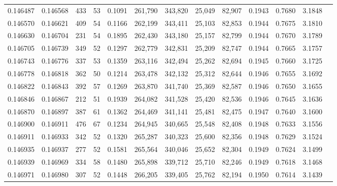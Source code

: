 \begin{tabular}{rrrrrrrrrrrrr}
0.146487 & 0.146568 &   433 &  53 &                                     0.1091 & 261,790 & 343,820 &  25,049 &  82,907 & 0.1943 & 0.7680 & 3.1848 \\
0.146570 & 0.146621 &   409 &  54 &                                     0.1166 & 262,199 & 343,411 &  25,103 &  82,853 & 0.1944 & 0.7675 & 3.1810 \\
0.146630 & 0.146704 &   231 &  54 &                                     0.1895 & 262,430 & 343,180 &  25,157 &  82,799 & 0.1944 & 0.7670 & 3.1789 \\
0.146705 & 0.146739 &   349 &  52 &                                     0.1297 & 262,779 & 342,831 &  25,209 &  82,747 & 0.1944 & 0.7665 & 3.1757 \\
0.146743 & 0.146776 &   337 &  53 &                                     0.1359 & 263,116 & 342,494 &  25,262 &  82,694 & 0.1945 & 0.7660 & 3.1725 \\
0.146778 & 0.146818 &   362 &  50 &                                     0.1214 & 263,478 & 342,132 &  25,312 &  82,644 & 0.1946 & 0.7655 & 3.1692 \\
0.146822 & 0.146843 &   392 &  57 &                                     0.1269 & 263,870 & 341,740 &  25,369 &  82,587 & 0.1946 & 0.7650 & 3.1655 \\
0.146846 & 0.146867 &   212 &  51 &                                     0.1939 & 264,082 & 341,528 &  25,420 &  82,536 & 0.1946 & 0.7645 & 3.1636 \\
0.146870 & 0.146897 &   387 &  61 &                                     0.1362 & 264,469 & 341,141 &  25,481 &  82,475 & 0.1947 & 0.7640 & 3.1600 \\
0.146900 & 0.146911 &   476 &  67 &                                     0.1234 & 264,945 & 340,665 &  25,548 &  82,408 & 0.1948 & 0.7633 & 3.1556 \\
0.146911 & 0.146933 &   342 &  52 &                                     0.1320 & 265,287 & 340,323 &  25,600 &  82,356 & 0.1948 & 0.7629 & 3.1524 \\
0.146935 & 0.146937 &   277 &  52 &                                     0.1581 & 265,564 & 340,046 &  25,652 &  82,304 & 0.1949 & 0.7624 & 3.1499 \\
0.146939 & 0.146969 &   334 &  58 &                                     0.1480 & 265,898 & 339,712 &  25,710 &  82,246 & 0.1949 & 0.7618 & 3.1468 \\
0.146971 & 0.146980 &   307 &  52 &                                     0.1448 & 266,205 & 339,405 &  25,762 &  82,194 & 0.1950 & 0.7614 & 3.1439 \\

\end{tabular}
